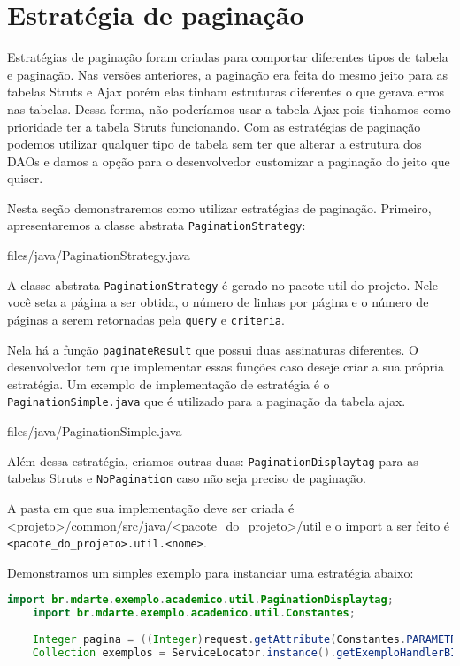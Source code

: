 \section{Estratégia de paginação}

Estratégias de paginação foram criadas para comportar diferentes tipos de tabela
e paginação. Nas versões anteriores, a paginação era feita do mesmo jeito para
as tabelas Struts e Ajax porém elas tinham estruturas diferentes o que gerava
erros nas tabelas. Dessa forma, não poderíamos usar a tabela Ajax pois tinhamos
como prioridade ter a tabela Struts funcionando. Com as estratégias de paginação
podemos utilizar qualquer tipo de tabela sem ter que alterar a estrutura dos
DAOs e damos a opção para o desenvolvedor customizar a paginação do jeito que
quiser.

Nesta seção demonstraremos como utilizar estratégias de paginação. Primeiro,
apresentaremos a classe abstrata \texttt{PaginationStrategy}:

 {files/java/PaginationStrategy.java}

A classe abstrata \texttt{PaginationStrategy} é gerado no pacote util do
projeto. Nele você seta a página a ser obtida,  o número de linhas por
página e o número de páginas a serem retornadas pela \texttt{query} e
\texttt{criteria}.

Nela há a função \texttt{paginateResult} que possui duas assinaturas diferentes.
O desenvolvedor tem que implementar essas funções caso deseje criar a sua
própria estratégia. Um exemplo de implementação de estratégia é o
\texttt{PaginationSimple.java} que é utilizado para a paginação da tabela ajax.

 {files/java/PaginationSimple.java}

Além dessa estratégia, criamos outras duas: \texttt{PaginationDisplaytag} para as tabelas Struts e \texttt{NoPagination} caso não seja preciso de paginação.

A pasta em que sua implementação deve ser criada é
<projeto>/common/src/java/<pacote\_do\_projeto>/util e o import a ser feito é
\texttt{<pacote\_do\_projeto>.util.<nome>}.

Demonstramos um simples exemplo para instanciar uma estratégia abaixo:

\begin{lstlisting}[language=java, frame=single, breaklines=true]
	import br.mdarte.exemplo.academico.util.PaginationDisplaytag;
	import br.mdarte.exemplo.academico.util.Constantes;
	
	Integer pagina = ((Integer)request.getAttribute(Constantes.PARAMETRO_PAGINA)); //Struts 1
	Collection exemplos = ServiceLocator.instance().getExemploHandlerBI().recuperaExemplos(new PaginationDisplaytag(paginacao));
\end{lstlisting}